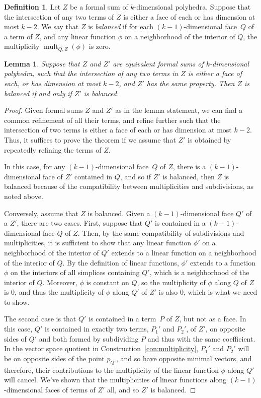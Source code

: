\documentclass[11pt,reqno]{amsart}
\newtheorem{lem}[thm]{Lemma}
\theoremstyle{definition}
\newtheorem{defn}[thm]{Definition}
\newcommand{\defi}[1]{\emph{#1}}
\newcommand{\mult}{\operatorname{mult}}
\begin{document}
\begin{defn}\label{d:balanced}
Let $Z$ be a formal sum of $k$-dimensional polyhedra. Suppose that the
intersection of any two terms of $Z$ is either a face of each or has dimension
at most $k-2$. We say that $Z$ is \defi{balanced} if for each
$(k-1)$-dimensional face~$Q$ of a term of $Z$, and any linear function $\phi$ on
a neighborhood of the interior of $Q$, the multiplicity $\mult_{Q,Z}(\phi)$ is
zero.
\end{defn}

\begin{lem}\label{l:balanced-equiv}
Suppose that $Z$ and $Z'$ are equivalent formal sums of $k$-dimensional
polyhedra, such that the intersection of any two terms in $Z$ is either a face
of each, or has dimension at most $k-2$, and $Z'$ has the same property. Then
$Z$ is balanced if and only if $Z'$ is balanced.
\end{lem}

\begin{proof}
Given formal sums $Z$ and $Z'$ as in the lemma statement, we can find a common
refinement of all their terms, and refine further such that the intersection of
two terms is either a face of each or has dimension at most $k-2$. Thus, it
suffices to prove the theorem if we assume that $Z'$ is obtained by repeatedly
refining the terms of $Z$.

In this case, for any $(k-1)$-dimensional face~$Q$ of $Z$, there is a
$(k-1)$-dimensional face of $Z'$ contained in $Q$, and so if $Z'$ is balanced,
then $Z$ is balanced because of the compatibility between multiplicities and
subdivisions, as noted above.

Conversely, assume that $Z$ is balanced. Given a $(k-1)$-dimensional face $Q'$
of a $Z'$, there are two cases. First, suppose that $Q'$ is contained in a
$(k-1)$-dimensional face $Q$ of $Z$. Then, by the same compatibility of
subdivisions and multiplicities, it is sufficient to show that any linear
function $\phi'$ on a neighborhood of the interior of $Q'$ extends to a linear
function on a neighborhood of the interior of $Q$. By the definition of linear
functions, $\phi'$ extends to a function $\phi$ on the interiors of all
simplices containing $Q'$, which is a neighborhood of the interior of $Q$.
Moreover, $\phi$ is constant on $Q$, so the multiplicity of $\phi$ along $Q$ of
$Z$ is $0$, and thus the multiplicity of $\phi$ along $Q'$ of $Z'$ is also $0$,
which is what we need to show.

The second case is that $Q'$ is contained in a term~$P$ of $Z$, but not as a
face. In this case, $Q'$ is contained in exactly two terms, $P_1'$ and $P_2'$,
of $Z'$, on opposite sides of $Q'$ and both formed by subdividing $P$ and thus
with the same coefficient. In the vector space quotient in
Construction~\ref{con:multiplicity}, $P_1'$ and $P_2'$ will be on opposite sides
of the point $p_{Q'}$, and so have opposite minimal vectors, and therefore,
their contributions to the multiplicity of the linear function $\phi$ along $Q'$
will cancel. We've shown that the multiplicities of linear functions along
$(k-1)$-dimensional faces of terms of $Z'$ all, and so $Z'$ is balanced.
\end{proof}
\end{document}
